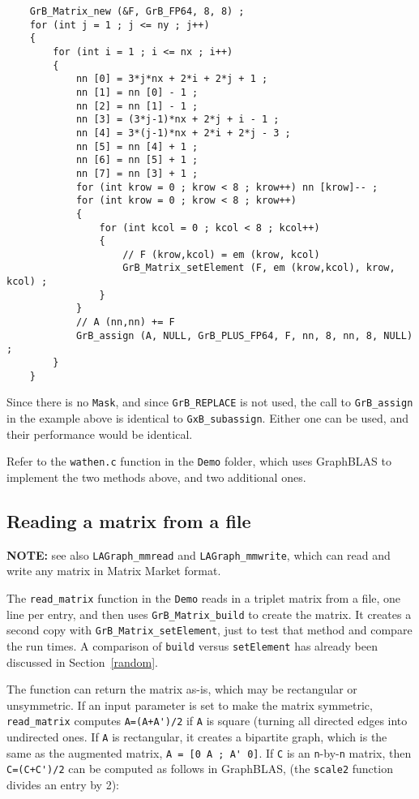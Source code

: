 \documentclass[12pt]{article}
\begin{document}
    {\footnotesize
    \begin{verbatim}
    GrB_Matrix_new (&F, GrB_FP64, 8, 8) ;
    for (int j = 1 ; j <= ny ; j++)
    {
        for (int i = 1 ; i <= nx ; i++)
        {
            nn [0] = 3*j*nx + 2*i + 2*j + 1 ;
            nn [1] = nn [0] - 1 ;
            nn [2] = nn [1] - 1 ;
            nn [3] = (3*j-1)*nx + 2*j + i - 1 ;
            nn [4] = 3*(j-1)*nx + 2*i + 2*j - 3 ;
            nn [5] = nn [4] + 1 ;
            nn [6] = nn [5] + 1 ;
            nn [7] = nn [3] + 1 ;
            for (int krow = 0 ; krow < 8 ; krow++) nn [krow]-- ;
            for (int krow = 0 ; krow < 8 ; krow++)
            {
                for (int kcol = 0 ; kcol < 8 ; kcol++)
                {
                    // F (krow,kcol) = em (krow, kcol)
                    GrB_Matrix_setElement (F, em (krow,kcol), krow, kcol) ;
                }
            }
            // A (nn,nn) += F
            GrB_assign (A, NULL, GrB_PLUS_FP64, F, nn, 8, nn, 8, NULL) ;
        }
    } \end{verbatim}}

Since there is no \verb'Mask', and since \verb'GrB_REPLACE' is not used, the call
to \verb'GrB_assign' in the example above is identical to \verb'GxB_subassign'.
Either one can be used, and their performance would be identical.

Refer to the \verb'wathen.c' function in the \verb'Demo' folder, which
uses GraphBLAS to implement the two methods above, and two additional ones.

\newpage
\subsection{Reading a matrix from a file}
\label{read}

{\bf NOTE:} see also \verb'LAGraph_mmread' and \verb'LAGraph_mmwrite', which
can read and write any matrix in Matrix Market format.

The \verb'read_matrix' function in the \verb'Demo' reads in a triplet matrix
from a file, one line per entry, and then uses \verb'GrB_Matrix_build' to
create the matrix.  It creates a second copy with \verb'GrB_Matrix_setElement',
just to test that method and compare the run times.  A comparison of
\verb'build' versus \verb'setElement' has already been discussed in
Section~\ref{random}.

The function can return the matrix as-is, which may be rectangular or
unsymmetric.  If an input parameter is set to make the matrix symmetric,
\verb'read_matrix' computes \verb"A=(A+A')/2" if \verb'A' is square (turning
all directed edges into undirected ones.  If \verb'A' is rectangular, it
creates a bipartite graph, which is the same as the augmented matrix,
\verb"A = [0 A ; A' 0]".
If \verb'C' is an \verb'n'-by-\verb'n' matrix, then \verb"C=(C+C')/2" can be
computed as follows in GraphBLAS, (the \verb'scale2' function divides an entry
by 2):
\end{document}
